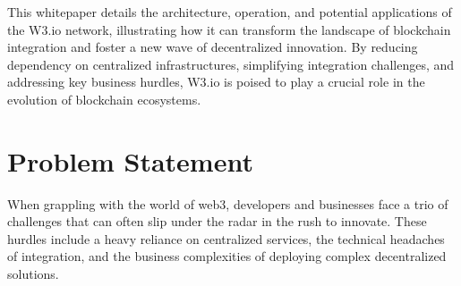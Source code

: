 \documentclass[11pt]{article}
\begin{document}
This whitepaper details the architecture, operation, and potential applications of the W3.io network, illustrating how it can transform the landscape of blockchain integration and foster a new wave of decentralized innovation. By reducing dependency on centralized infrastructures, simplifying integration challenges, and addressing key business hurdles, W3.io is poised to play a crucial role in the evolution of blockchain ecosystems.

\section{Problem Statement}
When grappling with the world of web3, developers and businesses face a trio of challenges that can often slip under the radar in the rush to innovate. These hurdles include a heavy reliance on centralized services, the technical headaches of integration, and the business complexities of deploying complex decentralized solutions.
\end{document}
